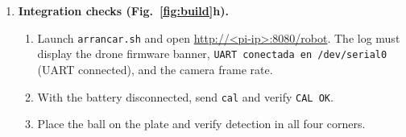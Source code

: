\begin{enumerate}[label=\textbf{Step \arabic*.}, leftmargin=*, align=left]
  \item \textbf{Integration checks (Fig.~\ref{fig:build}h).}
  \begin{enumerate}[label=(\alph*)]
    \item Launch \texttt{arrancar.sh} and open \url{http://<pi-ip>:8080/robot}. The log must display the drone firmware banner, \texttt{UART conectada en /dev/serial0} (UART connected), and the camera frame rate.
    \item With the battery disconnected, send \texttt{cal} and verify \texttt{CAL OK}.
    \item Place the ball on the plate and verify detection in all four corners.
  \end{enumerate}
\end{enumerate}
